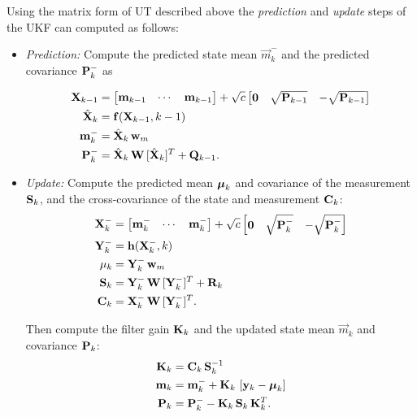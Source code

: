 Using the matrix form of UT described above the {\it prediction} and
{\it update} steps of the UKF can computed as follows:
%
\begin{itemize}
\item {\em Prediction:} Compute the predicted state mean $\vec{m}^-_k$
and the predicted covariance $\mathbf{P}^-_k$ as

%
\begin{equation}
\begin{split} \mathbf{X}_{k-1} &=
      \begin{bmatrix} \mathbf{m}_{k-1} & \cdots & \mathbf{m}_{k-1}
\end{bmatrix} + \sqrt{c}
      \begin{bmatrix} \mathbf{0} & \sqrt{\mathbf{P}_{k-1}} &
-\sqrt{\mathbf{P}_{k-1}}
      \end{bmatrix} \\ \hat{\mathbf{X}}_{k} &= \mathbf{f}(\mathbf{X}_{k-1},k-1)
\\ \mathbf{m}^-_{k} &= \hat{\mathbf{X}}_{k} \, \mathbf{w}_m \\ \mathbf{P}^-_{k} &=
\hat{\mathbf{X}}_{k} \, \mathbf{W} \, [ \hat{\mathbf{X}}_{k} ]^T +
\mathbf{Q}_{k-1}.
\end{split} \label{eq:ukf1_predict}
\end{equation}
%
\item {\em Update:} Compute the predicted mean $\boldsymbol{\mu}_k$ and
covariance of the measurement $\mathbf{S}_k$, and the cross-covariance of
the state and measurement $\mathbf{C}_k$:
%
\begin{equation}
\begin{split} \mathbf{X}^-_k &=
      \begin{bmatrix} \mathbf{m}^-_k & \cdots & \mathbf{m}^-_k \end{bmatrix}
+ \sqrt{c}
      \begin{bmatrix} \mathbf{0} & \sqrt{\mathbf{P}^-_k} &
-\sqrt{\mathbf{P}^-_k}
      \end{bmatrix} \\ \mathbf{Y}^-_k &= \mathbf{h}(\mathbf{X}^-_k,k) \\
\mathbf{\mu}_k &= \mathbf{Y}^-_k \, \mathbf{w}_m \\ \mathbf{S}_k &= \mathbf{Y}^-_k \,
\mathbf{W} \, [\mathbf{Y}^-_k]^T + \mathbf{R}_{k} \\ \mathbf{C}_k &= \mathbf{X}^-_k
\, \mathbf{W} \, [\mathbf{Y}^-_k]^T.
\end{split}
\label{eq:ukf1_update1}
\end{equation}
%

Then compute the filter gain $\mathbf{K}_k$ and the updated state mean
$\vec{m}_k$ and covariance $\mathbf{P}_k$:
%
\begin{equation}
\begin{split} \mathbf{K}_k &= \mathbf{C}_k \, \mathbf{S}_k^{-1} \\ \mathbf{m}_k &=
\mathbf{m}^-_k + \mathbf{K}_k \, \left[ \mathbf{y}_k - \boldsymbol{\mu}_k \right] \\
\mathbf{P}_k &= \mathbf{P}^-_k - \mathbf{K}_k \, \mathbf{S}_k \, \mathbf{K}_k^T.
\end{split}
\label{eq:ukf1_update2}
\end{equation}
\end{itemize}


